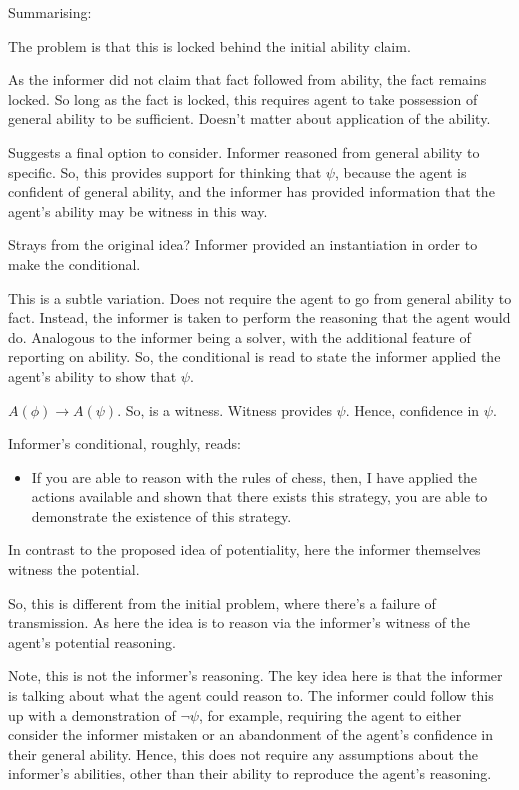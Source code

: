 \documentclass[10pt]{article}
\newcommand{\hozlinedash}[0]{%
  \noindent\hdashrule[0.5ex][c]{\textwidth}{.1pt}{2.5pt}
}
\begin{document}
\hozlinedash

Summarising:

The problem is that this is locked behind the initial ability claim.

As the informer did not claim that fact followed from ability, the fact remains locked.
So long as the fact is locked, this requires agent to take possession of general ability to be sufficient.
Doesn't matter about application of the ability.

\hozlinedash

Suggests a final option to consider.
Informer reasoned from general ability to specific.
So, this provides support for thinking that \(\psi\), because the agent is confident of general ability, and the informer has provided information that the agent's ability may be witness in this way.

\hozlinedash

Strays from the original idea?
Informer provided an instantiation in order to make the conditional.

This is a subtle variation.
Does not require the agent to go from general ability to fact.
Instead, the informer is taken to perform the reasoning that the agent would do.
Analogous to the informer being a solver, with the additional feature of reporting on ability.
So, the conditional is read to state the informer applied the agent's ability to show that \(\psi\).

\(A(\phi) \rightarrow A(\psi)\).
So, is a witness.
Witness provides \(\psi\).
Hence, confidence in \(\psi\).

Informer's conditional, roughly, reads:

\begin{itemize}
\item If you are able to reason with the rules of chess, then, I have applied the actions available and shown that there exists this strategy, you are able to demonstrate the existence of this strategy.
\end{itemize}

In contrast to the proposed idea of potentiality, here the informer themselves witness the potential.

So, this is different from the initial problem, where there's a failure of transmission.
As here the idea is to reason via the informer's witness of the agent's potential reasoning.

Note, this is not the informer's reasoning.
The key idea here is that the informer is talking about what the agent could reason to.
The informer could follow this up with a demonstration of \(\lnot\psi\), for example, requiring the agent to either consider the informer mistaken or an abandonment of the agent's confidence in their general ability.
Hence, this does not require any assumptions about the informer's abilities, other than their ability to reproduce the agent's reasoning.
\end{document}
